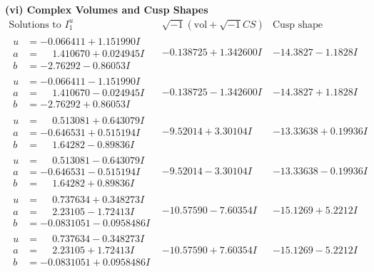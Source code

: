 \documentclass[1p]{elsarticle_modified}
\theoremstyle{definition}
\newcommand{\I}{\sqrt{-1}}
\begin{document}
\newpage\flushleft \textbf{(vi) Complex Volumes and Cusp Shapes}
$$\begin{array}{c|c|c}  
\text{Solutions to }I^u_{1}& \I (\text{vol} + \sqrt{-1}CS) & \text{Cusp shape}\\
 \hline 
\begin{aligned}
u &= -0.066411 + 1.151990 I \\
a &= \phantom{-}1.410670 + 0.024945 I \\
b &= -2.76292 - 0.86053 I\end{aligned}
 & -0.138725 + 1.342600 I & -14.3827 - 1.1828 I \\ \hline\begin{aligned}
u &= -0.066411 - 1.151990 I \\
a &= \phantom{-}1.410670 - 0.024945 I \\
b &= -2.76292 + 0.86053 I\end{aligned}
 & -0.138725 - 1.342600 I & -14.3827 + 1.1828 I \\ \hline\begin{aligned}
u &= \phantom{-}0.513081 + 0.643079 I \\
a &= -0.646531 + 0.515194 I \\
b &= \phantom{-}1.64282 - 0.89836 I\end{aligned}
 & -9.52014 + 3.30104 I & -13.33638 + 0.19936 I \\ \hline\begin{aligned}
u &= \phantom{-}0.513081 - 0.643079 I \\
a &= -0.646531 - 0.515194 I \\
b &= \phantom{-}1.64282 + 0.89836 I\end{aligned}
 & -9.52014 - 3.30104 I & -13.33638 - 0.19936 I \\ \hline\begin{aligned}
u &= \phantom{-}0.737634 + 0.348273 I \\
a &= \phantom{-}2.23105 - 1.72413 I \\
b &= -0.0831051 - 0.0958486 I\end{aligned}
 & -10.57590 - 7.60354 I & -15.1269 + 5.2212 I \\ \hline\begin{aligned}
u &= \phantom{-}0.737634 - 0.348273 I \\
a &= \phantom{-}2.23105 + 1.72413 I \\
b &= -0.0831051 + 0.0958486 I\end{aligned}
 & -10.57590 + 7.60354 I & -15.1269 - 5.2212 I \\ \hline\begin{aligned}

\end{aligned}
\end{array}$$
\end{document}
